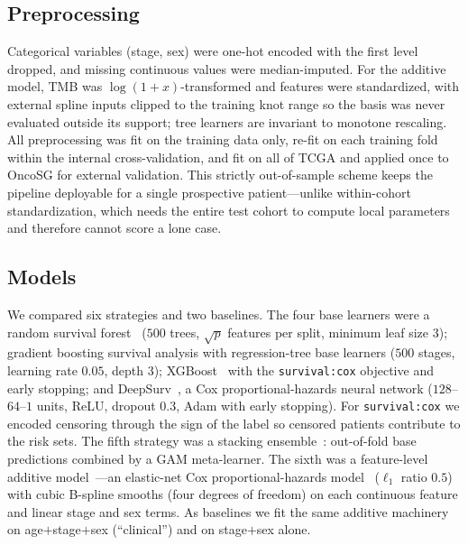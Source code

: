 \documentclass[journal]{IEEEtran}
\begin{document}
\subsection{Preprocessing}
Categorical variables (stage, sex) were one-hot encoded with the first level
dropped, and missing continuous values were median-imputed. For the additive
model, TMB was $\log(1+x)$-transformed and features were standardized, with
external spline inputs clipped to the training knot range so the basis was never
evaluated outside its support; tree learners are invariant to monotone
rescaling. All preprocessing was fit on the training data only, re-fit on each
training fold within the internal cross-validation, and fit on all of TCGA and
applied once to OncoSG for external validation. This strictly out-of-sample
scheme keeps the pipeline deployable for a single prospective patient---unlike
within-cohort standardization, which needs the entire test cohort to compute
local parameters and therefore cannot score a lone case.

\subsection{Models}
We compared six strategies and two baselines. The four base learners were a
random survival forest~\cite{ishwaran2008} ($500$ trees, $\sqrt{p}$ features per
split, minimum leaf size $3$); gradient boosting survival analysis with
regression-tree base learners ($500$ stages, learning rate $0.05$, depth $3$);
XGBoost~\cite{chen2016} with the \texttt{survival:cox} objective and early
stopping; and DeepSurv~\cite{katzman2018}, a Cox proportional-hazards neural
network ($128$--$64$--$1$ units, ReLU, dropout $0.3$, Adam with early stopping).
For \texttt{survival:cox} we encoded censoring through the sign of the label so
censored patients contribute to the risk sets. The fifth strategy was a stacking
ensemble~\cite{wolpert1992}: out-of-fold base predictions combined by a GAM
meta-learner. The sixth was a feature-level additive model~\cite{hastie1990}---an
elastic-net Cox proportional-hazards model~\cite{cox1972} ($\ell_1$ ratio $0.5$)
with cubic B-spline smooths (four degrees of freedom) on each continuous feature
and linear stage and sex terms. As baselines
we fit the same additive machinery on age$+$stage$+$sex (``clinical'') and on
stage$+$sex alone.
\end{document}
